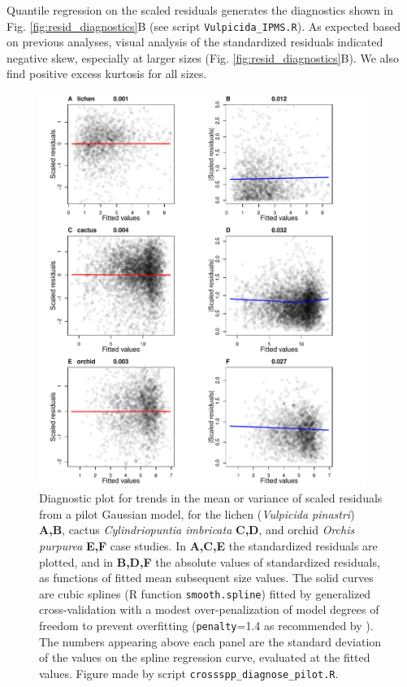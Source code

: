 \documentclass[12pt]{article}
\begin{document}
Quantile regression on the scaled residuals generates the diagnostics shown in Fig. \ref{fig:resid_diagnostics}B (see script \texttt{Vulpicida\_IPMS.R}).
As expected based on previous analyses, visual analysis of the standardized residuals indicated negative skew, especially at larger sizes (Fig. \ref{fig:resid_diagnostics}B).
We also find positive excess kurtosis for all sizes. 

\begin{figure}[tbp]
	\centering
	\includegraphics[width=0.95\textwidth]{figures/cactus_k=6.pdf}
	\caption{Diagnostic plot for trends in the mean or variance of scaled residuals from a pilot Gaussian model, for the lichen (\emph{Vulpicida pinastri}) \textbf{A,B}, cactus \emph{Cylindriopuntia imbricata} \textbf{C,D}, and orchid \emph{Orchis purpurea} \textbf{E,F} case studies. In \textbf{A,C,E} the standardized residuals are plotted, and in \textbf{B,D,F} the absolute values of
standardized residuals, as functions of fitted mean subsequent size values. The solid curves are cubic splines (R function \texttt{smooth.spline}) fitted by generalized cross-validation with a modest over-penalization of model degrees of freedom to prevent overfitting (\texttt{penalty}=1.4 as recommended by \citet{gu-2002}). The numbers appearing above each panel are the standard deviation of the values on the spline regression curve, evaluated at the fitted values. Figure made by script \texttt{crossspp\_diagnose\_pilot.R}.}
	\label{fig:diagnose_pilot}
\end{figure}
\end{document}
